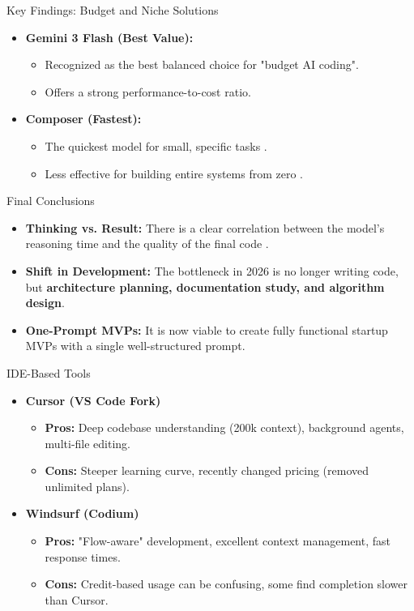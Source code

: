 \documentclass[aspectratio=169]{beamer}
\begin{document}
\begin{frame}[t]{Key Findings: Budget and Niche Solutions}
    \begin{itemize}
        \item \textbf{Gemini 3 Flash (Best Value):}
        \begin{itemize}
            \item Recognized as the best balanced choice for "budget AI coding".
            \item Offers a strong performance-to-cost ratio.
        \end{itemize}
        \item \textbf{Composer (Fastest):}
        \begin{itemize}
            \item The quickest model for small, specific tasks .
            \item Less effective for building entire systems from zero .
        \end{itemize}
    \end{itemize}
\end{frame}

\begin{frame}[t]{Final Conclusions}
    \begin{itemize}
        \item \textbf{Thinking vs. Result:} There is a clear correlation between the model's reasoning time and the quality of the final code .
        \item \textbf{Shift in Development:} The bottleneck in 2026 is no longer writing code, but \textbf{architecture planning, documentation study, and algorithm design}.
        \item \textbf{One-Prompt MVPs:} It is now viable to create fully functional startup MVPs with a single well-structured prompt.
    \end{itemize}
\end{frame}


\begin{frame}[t]{IDE-Based Tools}
    \begin{itemize}
        \item \textbf{Cursor (VS Code Fork)}
        \begin{itemize}
            \item \textbf{Pros:} Deep codebase understanding (200k context), background agents, multi-file editing.
            \item \textbf{Cons:} Steeper learning curve, recently changed pricing (removed unlimited plans).
        \end{itemize}
        \item \textbf{Windsurf (Codium)}
        \begin{itemize}
            \item \textbf{Pros:} "Flow-aware" development, excellent context management, fast response times.
            \item \textbf{Cons:} Credit-based usage can be confusing, some find completion slower than Cursor.
        \end{itemize}
    \end{itemize}
\end{frame}
\end{document}
